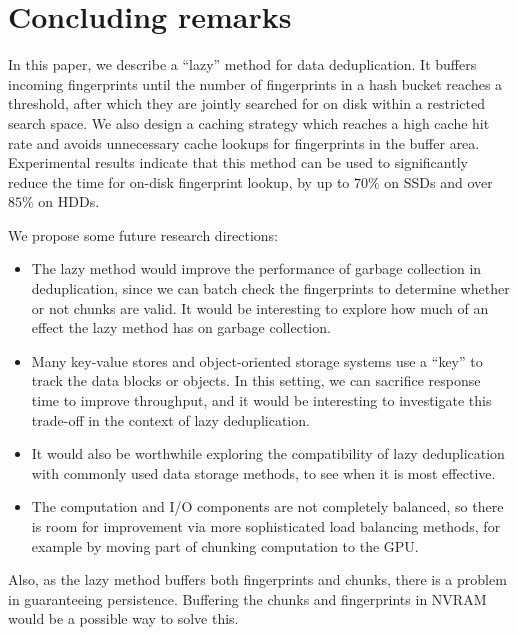 \documentclass[prodmode,acmtecs]{acmsmall}
\begin{document}
\section{Concluding remarks}
\label{sec:conclusion}

In this paper, we describe a ``lazy'' method for data deduplication. It buffers incoming fingerprints until the number of fingerprints in a hash bucket reaches a threshold, after which they are jointly searched for on disk within a restricted search space.  We also design a caching strategy which reaches a high cache hit rate and avoids unnecessary cache lookups for fingerprints in the buffer area.  Experimental results indicate that this method can be used to significantly reduce the time for on-disk fingerprint lookup, by up to $70\%$ on SSDs and over $85\%$ on HDDs.

We propose some future research directions:
\begin{itemize}
 \item The lazy method would improve the performance of garbage collection in deduplication, since we can batch check the fingerprints to determine whether or not chunks are valid. It would be interesting to explore how much of an effect the lazy method has on garbage collection.
 \item Many key-value stores and object-oriented storage systems use a ``key'' to track the data blocks or objects. In this setting, we can sacrifice response time to improve throughput, and it would be interesting to investigate this trade-off in the context of lazy deduplication.
 \item It would also be worthwhile exploring the compatibility of lazy deduplication with commonly used data storage methods, to see when it is most effective.
 \item The computation and I/O components are not completely balanced, so there is room for improvement via more sophisticated load balancing methods, for example by moving part of chunking computation to the GPU.
\end{itemize}

Also, as the lazy method buffers both fingerprints and chunks, there is a problem in guaranteeing persistence. Buffering the chunks and fingerprints in NVRAM would be a possible way to solve this.





%




\medskip
\end{document}
